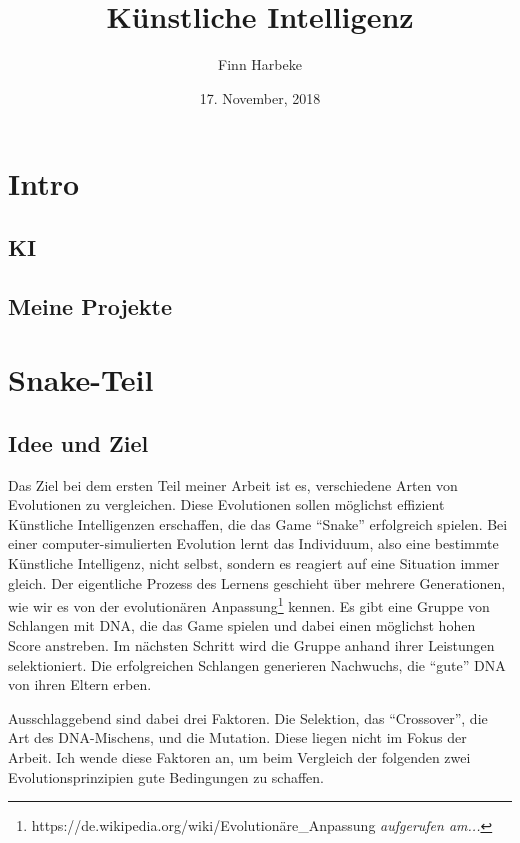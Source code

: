 \documentclass[11pt,a4paper,ngerman]{article}
\author{Finn Harbeke}
\title{Künstliche Intelligenz}
\date{17. November, 2018}
\begin{document}
\setlength\parindent{0pt}
\maketitle
\tableofcontents

\section{Intro}

\subsection{KI}

\subsection{Meine Projekte}

\section{Snake-Teil}

\subsection{Idee und Ziel}

Das Ziel bei dem ersten Teil meiner Arbeit ist es, verschiedene Arten von Evolutionen zu vergleichen. Diese Evolutionen sollen möglichst effizient  Künstliche Intelligenzen erschaffen, die das Game \enquote{Snake} erfolgreich spielen. Bei einer computer-simulierten Evolution lernt das Individuum, also eine bestimmte Künstliche Intelligenz, nicht selbst, sondern es reagiert auf eine Situation immer gleich. Der eigentliche Prozess des Lernens geschieht über mehrere Generationen, wie wir es von der evolutionären Anpassung\footnote{https://de.wikipedia.org/wiki/Evolutionäre\_Anpassung \textit{aufgerufen am...}} kennen. Es gibt eine Gruppe von Schlangen mit DNA, die das Game spielen und dabei einen möglichst hohen Score anstreben. Im nächsten Schritt wird die Gruppe anhand ihrer Leistungen selektioniert. Die erfolgreichen Schlangen generieren Nachwuchs, die \enquote{gute} DNA von ihren Eltern erben.

\bigskip
Ausschlaggebend sind dabei drei Faktoren. Die Selektion, das \enquote{Crossover}, die Art des DNA-Mischens, und die Mutation. Diese liegen nicht im Fokus der Arbeit. Ich wende diese Faktoren an, um beim Vergleich der folgenden zwei Evolutionsprinzipien gute Bedingungen zu schaffen.
\end{document}
